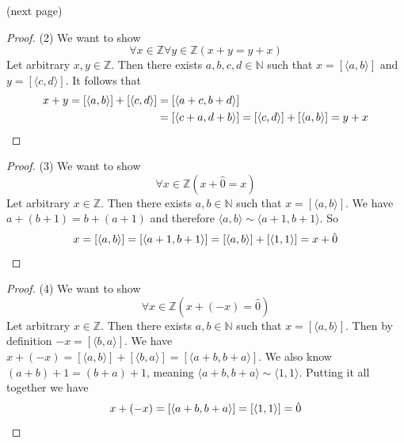\documentclass{report}
\begin{document}
\noindent(next page)\newpage
\begin{proof}(2)
We want to show
\begin{equation*}
\forall x\in\mathbb Z\forall y\in\mathbb Z(x+y=y+x)
\end{equation*}
Let arbitrary $x,y\in\mathbb Z$. Then there exists $a,b,c,d\in\mathbb N$ such that $x=[\langle a,b\rangle]$ and $y=[\langle c,d\rangle]$. It follows that 
\begin{align*}
x+y=[\langle a,b\rangle]+[\langle c,d\rangle]&=[\langle a+c,b+d\rangle]\\
&=[\langle c+a,d+b\rangle]=[\langle c,d\rangle]+[\langle a,b\rangle]=y+x\qedhere
\end{align*}
\end{proof}
\begin{proof}(3)
We want to show
\begin{equation*}
\forall x\in\mathbb Z(x+\hat0=x)
\end{equation*}
Let arbitrary $x\in\mathbb Z$. Then there exists $a,b\in\mathbb N$ such that $x=[\langle a,b\rangle]$. We have $a+(b+1)=b+(a+1)$ and therefore $\langle a,b\rangle\sim\langle a+1,b+1\rangle$.
So
\begin{equation*}
x=[\langle a,b\rangle]=[\langle a+1,b+1\rangle]=[\langle a,b\rangle]+[\langle 1,1\rangle]=x+\hat0\qedhere
\end{equation*}
\end{proof}
\begin{proof}(4)
We want to show
\begin{equation*}
\forall x\in\mathbb Z(x+(-x)=\hat0)
\end{equation*}
Let arbitrary $x\in\mathbb Z$. Then there exists $a,b\in\mathbb N$ such that $x=[\langle a,b\rangle]$. Then by definition $-x=[\langle b,a\rangle]$.
We have $x+(-x)=[\langle a,b\rangle]+[\langle b,a\rangle]=[\langle a+b,b+a\rangle]$.
We also know $(a+b)+1=(b+a)+1$, meaning $\langle a+b,b+a\rangle\sim\langle 1,1\rangle$. Putting it all together we have
\begin{equation*}
x+(-x)=[\langle a+b,b+a\rangle]=[\langle 1,1\rangle]=\hat0\qedhere
\end{equation*}
\end{proof}
\end{document}
